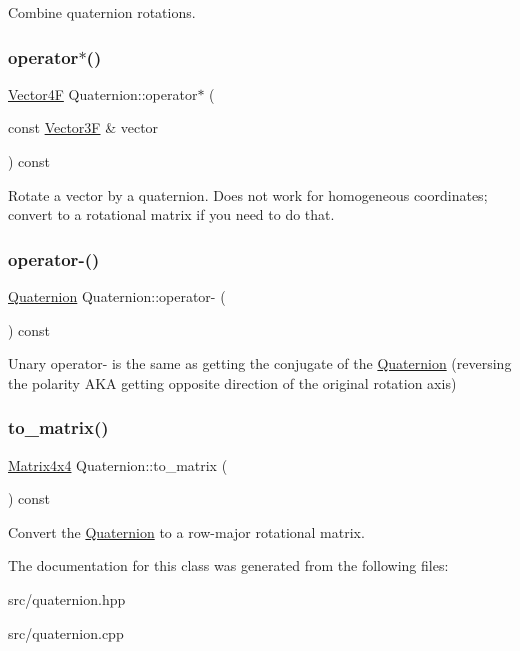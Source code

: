 Combine quaternion rotations. \mbox{\label{class_quaternion_af0ec7fb0212b1761149d9bd36bf87455}} 
\subsubsection{\texorpdfstring{operator$\ast$()}{operator*()}\hspace{0.1cm}{\footnotesize\ttfamily [2/2]}}
{\footnotesize\ttfamily \mbox{\hyperlink{class_vector4}{Vector4F}} Quaternion\+::operator$\ast$ (\begin{DoxyParamCaption}\item[{const \mbox{\hyperlink{class_vector3}{Vector3F}} \&}]{vector }\end{DoxyParamCaption}) const}

Rotate a vector by a quaternion. Does not work for homogeneous coordinates; convert to a rotational matrix if you need to do that. \mbox{\label{class_quaternion_aff7a0a5aeea4a3fe860cb90a649e389c}} 
\subsubsection{\texorpdfstring{operator-\/()}{operator-()}}
{\footnotesize\ttfamily \mbox{\hyperlink{class_quaternion}{Quaternion}} Quaternion\+::operator-\/ (\begin{DoxyParamCaption}{ }\end{DoxyParamCaption}) const}

Unary operator-\/ is the same as getting the conjugate of the \mbox{\hyperlink{class_quaternion}{Quaternion}} (reversing the polarity A\+KA getting opposite direction of the original rotation axis) \mbox{\label{class_quaternion_ae0309902fc8b7d8aa1f4075a73fee928}} 
\subsubsection{\texorpdfstring{to\+\_\+matrix()}{to\_matrix()}}
{\footnotesize\ttfamily \mbox{\hyperlink{class_matrix4x4}{Matrix4x4}} Quaternion\+::to\+\_\+matrix (\begin{DoxyParamCaption}{ }\end{DoxyParamCaption}) const}

Convert the \mbox{\hyperlink{class_quaternion}{Quaternion}} to a row-\/major rotational matrix. 

The documentation for this class was generated from the following files\+:\begin{DoxyCompactItemize}
\item 
src/quaternion.\+hpp\item 
src/quaternion.\+cpp\end{DoxyCompactItemize}
